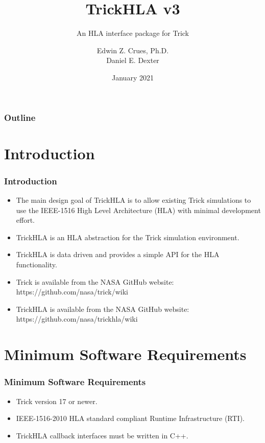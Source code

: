 \documentclass{beamer}
\title[TrickHLA]{TrickHLA v3}
\subtitle{An HLA interface package for Trick}
\author[Crues,Dexter]{Edwin Z. Crues, Ph.D. \\ Daniel E. Dexter}
\institute[NASA JSC] %
{
Simulation and Graphics Branch (ER7)\\
NASA Johnson Space Center \\
2101 NASA Parkway, Houston, Texas, 77058\\
\medskip
\texttt{edwin.z.crues@nasa.gov}\\
\texttt{daniel.e.dexter@nasa.gov}
}
\date{January 2021}
\begin{document}
   \begin{frame}
      \titlepage
   \end{frame}

   \begin{frame}
      \frametitle{Outline}
      \tableofcontents
   \end{frame}
   
   \section{Introduction}
   
   \begin{frame}
      \frametitle{Introduction}
      \begin{itemize}
         \item The main design goal of TrickHLA is to allow existing Trick simulations to use the IEEE-1516 High Level Architecture (HLA) with minimal development effort.
         \item TrickHLA is an HLA abstraction for the Trick simulation environment.
         \item TrickHLA is data driven and provides a simple API for the HLA functionality.
         \item Trick is available from the NASA GitHub website: \\
         https://github.com/nasa/trick/wiki
         \item TrickHLA is available from the NASA GitHub website: \\
         https://github.com/nasa/trickhla/wiki
      \end{itemize}
   \end{frame}
   
   \section{Minimum Software Requirements}
   
   \begin{frame}
      \frametitle{Minimum Software Requirements}
      \begin{itemize}
         \item Trick version 17 or newer.
         \item IEEE-1516-2010 HLA standard compliant Runtime Infrastructure (RTI).
         \item TrickHLA callback interfaces must be written in C++.
      \end{itemize}
   \end{frame}
   
\end{document}
